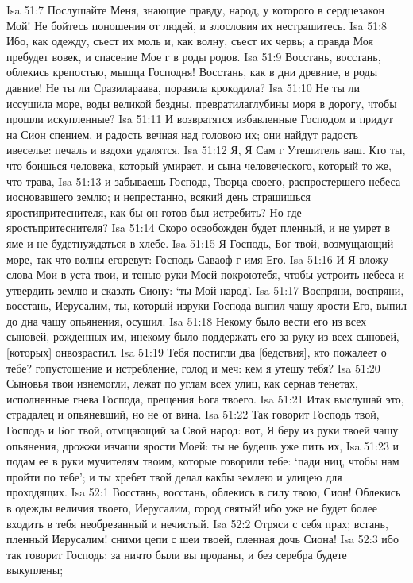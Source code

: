 Isa 51:7  Послушайте Меня, знающие правду, народ, у которого в сердцезакон Мой! Не бойтесь поношения от людей, и злословия их нестрашитесь.
Isa 51:8  Ибо, как одежду, съест их моль и, как волну, съест их червь; а правда Моя пребудет вовек, и спасение Мое г в роды родов.
Isa 51:9  Восстань, восстань, облекись крепостью, мышца Господня! Восстань, как в дни древние, в роды давние! Не ты ли Сразилараава, поразила крокодила?
Isa 51:10  Не ты ли иссушила море, воды великой бездны, превратилаглубины моря в дорогу, чтобы прошли искупленные?
Isa 51:11  И возвратятся избавленные Господом и придут на Сион спением, и радость вечная над головою их; они найдут радость ивеселье: печаль и вздохи удалятся.
Isa 51:12  Я, Я Сам г Утешитель ваш. Кто ты, что боишься человека, который умирает, и сына человеческого, который то же, что трава,
Isa 51:13  и забываешь Господа, Творца своего, распростершего небеса иосновавшего землю; и непрестанно, всякий день страшишься яростипритеснителя, как бы он готов был истребить? Но где яростьпритеснителя?
Isa 51:14  Скоро освобожден будет пленный, и не умрет в яме и не будетнуждаться в хлебе.
Isa 51:15  Я Господь, Бог твой, возмущающий море, так что волны егоревут: Господь Саваоф г имя Его.
Isa 51:16  И Я вложу слова Мои в уста твои, и тенью руки Моей покроютебя, чтобы устроить небеса и утвердить землю и сказать Сиону: `ты Мой народ'.
Isa 51:17  Воспряни, воспряни, восстань, Иерусалим, ты, который изруки Господа выпил чашу ярости Его, выпил до дна чашу опьянения, осушил.
Isa 51:18  Некому было вести его из всех сыновей, рожденных им, инекому было поддержать его за руку из всех сыновей, [которых] онвозрастил.
Isa 51:19  Тебя постигли два [бедствия], кто пожалеет о тебе? гопустошение и истребление, голод и меч: кем я утешу тебя?
Isa 51:20  Сыновья твои изнемогли, лежат по углам всех улиц, как сернав тенетах, исполненные гнева Господа, прещения Бога твоего.
Isa 51:21  Итак выслушай это, страдалец и опьяневший, но не от вина.
Isa 51:22  Так говорит Господь твой, Господь и Бог твой, отмщающий за Свой народ: вот, Я беру из руки твоей чашу опьянения, дрожжи изчаши ярости Моей: ты не будешь уже пить их,
Isa 51:23  и подам ее в руки мучителям твоим, которые говорили тебе: `пади ниц, чтобы нам пройти по тебе'; и ты хребет твой делал какбы землею и улицею для проходящих.
Isa 52:1  Восстань, восстань, облекись в силу твою, Сион! Облекись в одежды величия твоего, Иерусалим, город святый! ибо уже не будет более входить в тебя необрезанный и нечистый.
Isa 52:2  Отряси с себя прах; встань, пленный Иерусалим! сними цепи с шеи твоей, пленная дочь Сиона!
Isa 52:3  ибо так говорит Господь: за ничто были вы проданы, и без серебра будете выкуплены;
